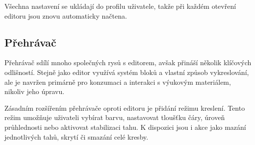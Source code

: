 Všechna nastavení se ukládají do profilu uživatele, takže při každém otevření editoru jsou znovu automaticky načtena.








\subsection{Přehrávač}

Přehrávač sdílí mnoho společných rysů s editorem, avšak přináší několik klíčových odlišností. 
Stejně jako editor využívá systém bloků a vlastní způsob vykreslování, ale je navržen primárně pro konzumaci a interakci s výukovým materiálem, nikoliv jeho úpravu.

Zásadním rozšířením přehrávače oproti editoru je přidání režimu kreslení. 
Tento režim umožňuje uživateli vybírat barvu, nastavovat tloušťku čáry, úroveň průhlednosti nebo aktivovat stabilizaci tahu. 
K dispozici jsou i akce jako mazání jednotlivých tahů, skrytí či smazání celé kresby.

